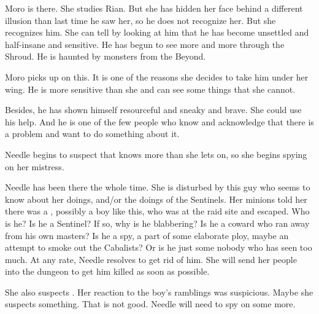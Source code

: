\begin{comment}
  \section{Moro thinks}
\end{comment}
\new
Moro is there. 
She studies Rian.
But she has hidden her face behind a different illusion than last time he saw her, so he does not recognize her. 
But she recognizes him.
She can tell by looking at him that he has become unsettled and half-insane and sensitive. 
He has begun to see more and more through the Shroud. 
He is haunted by monsters from the Beyond. 

Moro picks up on this. 
It is one of the reasons she decides to take him under her wing. 
He is more sensitive than she and can see some things that she cannot. 

Besides, he has shown himself resourceful and sneaky and brave. 
She could use his help. 
And he is one of the few people who know and acknowledge that there is a problem and want to do something about it. 





\begin{comment}
  \section{Needle thinks}
\end{comment}
\new
Needle begins to suspect that \Tiroco{} knows more than she lets on, so she begins spying on her mistress. 

Needle has been there the whole time. 
She is disturbed by this guy who seems to know about her doings, and/or the doings of the Sentinels. 
Her minions told her there was a \human, possibly a boy like this, who was at the raid site and escaped. 
Who is he?
Is he a Sentinel? 
If so, why is he blabbering? 
Is he a coward who ran away from his own masters?
Is he a spy, a part of some elaborate ploy, maybe an attempt to smoke out the Cabalists?
Or is he just some nobody who has seen too much. 
At any rate, Needle resolves to get rid of him. 
She will send her people into the dungeon to get him killed as soon as possible. 

She also suspects \Tiroco. 
Her reaction to the boy's ramblings was suspicious. 
Maybe she suspects something. 
That is not good. 
Needle will need to spy on \Tiroco some more. 









